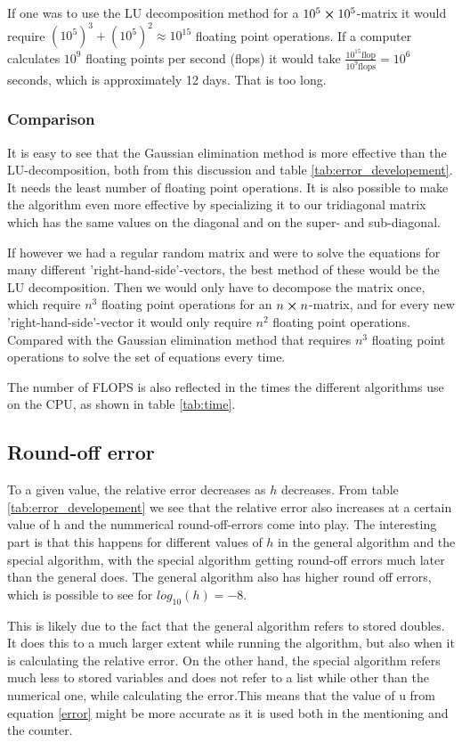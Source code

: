 If one was to use the LU decomposition method for a $10^5 \cross 10^5$-matrix it would require $\left(10^5\right)^3 + \left(10^5\right)^2 \approx 10^{15} $ floating point operations. If a computer calculates $10^9$ floating points per second (flops) it would take $\frac{10^{15}\text{flop}}{10^{9}\text{flops}} = 10^6$ seconds, which is approximately 12 days. That is too long.

\subsubsection{Comparison}

It is easy to see that the Gaussian elimination method is more effective than the LU-decomposition, both from this discussion and table \ref{tab:error_developement}. It needs the least number of floating point operations. It is also possible to make the algorithm even more effective by specializing it to our tridiagonal matrix which has the same values on the diagonal and on the super- and sub-diagonal. 

If however we had a regular random matrix and were to solve the equations for many different 'right-hand-side'-vectors, the best method of these would be the LU decomposition. Then we would only have to decompose the matrix once, which require $n^3$ floating point operations for an $n \cross n$-matrix, and for every new 'right-hand-side'-vector it would only require $n^2$ floating point operations. Compared with the Gaussian elimination method that requires $n^3$ floating point operations to solve the set of equations every time.

The number of FLOPS is also reflected in the times the different algorithms use on the CPU, as shown in table \ref{tab:time}. 


\subsection{Round-off error}

To a given value, the relative error decreases as $ h $ decreases. From table \ref{tab:error_developement} we see that the relative error also increases at a certain value of h and the nummerical round-off-errors come into play. The interesting part is that this happens for different values of $ h $ in the general algorithm and the special algorithm, with the special algorithm getting round-off errors much later than the general does. The general algorithm also has higher round off errors, which is possible to see for $ log_{10}(h) = -8 $. 

This is likely due to the fact that the general algorithm refers to stored doubles. It does this to a much larger extent while running the algorithm, but also when it is calculating the relative error. On the other hand, the special algorithm refers much less to stored variables and does not refer to a list while other than the numerical one, while calculating the error.This means that the value of u from equation \ref{error} might be more accurate as it is used both in the mentioning and the counter. 


